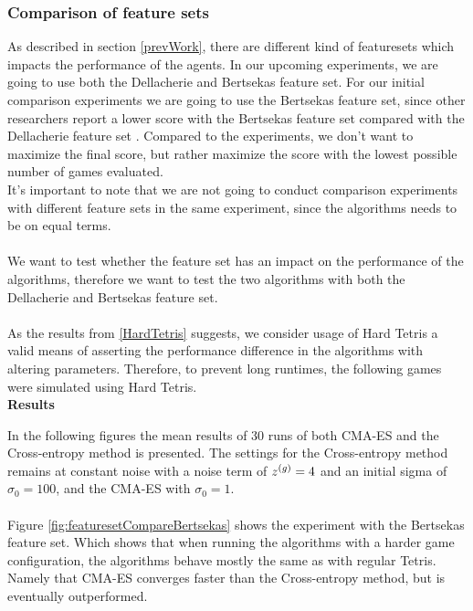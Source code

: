 \subsubsection{Comparison of feature sets  \label{compoffeatureset}}
As described in section \ref{prevWork}, there are different kind of featuresets which
impacts the performance of the agents. In our upcoming experiments, we are going to
use both the Dellacherie and Bertsekas feature set. For our initial comparison experiments
we are going to use the Bertsekas feature set, since other researchers report
a lower score with the Bertsekas feature set compared with the Dellacherie feature set
\citep{thiery:09}. Compared to the \citep{thiery:09} experiments, we don't want to maximize the
final score, but rather maximize the score with the lowest possible number of 
games evaluated.\\
It's important to note that we are not going to conduct comparison experiments with different
feature sets in the same experiment, since the algorithms needs to be on equal terms.\\
\\
We want to test whether the feature set has an impact on the performance of the algorithms,
therefore we want to test the two algorithms with both the Dellacherie and Bertsekas feature set.\\
\\
As the results from \ref{HardTetris} suggests, we consider usage of Hard Tetris \citep{boumaza2009} a valid means of asserting the performance difference in the algorithms with altering parameters.
Therefore, to prevent long runtimes, the following games were simulated
using Hard Tetris.\\

\textbf{Results}

In the following figures the mean results of 30 runs of both CMA-ES and the Cross-entropy method is presented. The settings for the Cross-entropy method remains at constant noise
with a noise term of $z^{(g)} = 4$ and an initial sigma of $\sigma_0 = 100$, 
and the CMA-ES with $\sigma_0 = 1$.\\
\\
Figure \ref{fig:featuresetCompareBertsekas} shows the experiment with the 
Bertsekas feature set. Which shows that when running the algorithms with a
harder game configuration, the algorithms behave mostly the same as with regular 
Tetris. Namely that CMA-ES converges faster than the Cross-entropy method, 
but is eventually outperformed.

